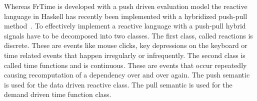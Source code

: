 \documentclass[12pt]{ucthesis}
\begin{document}
Whereas FrTime is developed with a push driven evaluation model the reactive language in Haskell has recently been implemented with a hybridized push-pull method~\cite{push-pull-frp}. To effectively implement a reactive language with a push-pull hybrid signals have to be decomposed into two classes. The first class, called reactions is discrete. These are events like mouse clicks, key depressions on the keyboard or time related events that happen irregularly or infrequently. The second class is called time functions and is continuous. These are events that occur repeatedly causing recomputation of a dependency over and over again. The push semantic is used for the data driven reactive class. The pull semantic is used for the demand driven time function class.
\end{document}
